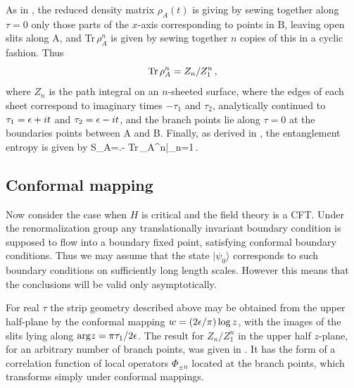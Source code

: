 As in \cite{cc-04}, the reduced density matrix $\rho_A(t)$ is giving
by sewing together along $\tau=0$ only those parts of the $x$-axis
corresponding to points in B, leaving open slits along A, and
Tr$\,\rho_A^n$ is given by sewing together $n$ copies of this in a
cyclic fashion. Thus
\begin{equation}
{\rm Tr}\,\rho_A^n=Z_n/Z_1^n\,,
\end{equation}
where $Z_n$ is the path integral on an $n$-sheeted surface, where
the edges of each sheet correspond to imaginary times $-\tau_1$
and $\tau_2$, analytically continued to $\tau_1=\epsilon+it$ and
$\tau_2=\epsilon-it$, and the branch points lie along $\tau=0$ at
the boundaries points between A and B.
Finally, as derived in \cite{cc-04}, the entanglement entropy is given by
\be
S_A=\left.- {\rm Tr}\,\rho_A^n\right|_{n=1}\,.
\ee


\subsection{Conformal mapping}

Now consider the case when $H$ is critical and the field theory is
a CFT. Under the renormalization group any translationally
invariant boundary condition is supposed to flow into a boundary
fixed point, satisfying conformal boundary conditions. Thus we may
assume that the state $|\psi_0\rangle$ corresponds to such
boundary conditions on sufficiently long length scales. However
this means that the conclusions will be valid only asymptotically.

For real $\tau$ the strip geometry described above may be obtained
from the upper half-plane by the conformal mapping
$w=(2\epsilon/\pi)\log z$, with the images of the slits lying along
${\rm arg} z=\pi\tau_1/2\epsilon$. The result for $Z_n/Z_1^n$ in the
upper half $z$-plane, for an arbitrary number of branch points,
was given in \cite{cc-04}. It has the form of a correlation
function of local operators $\Phi_{\pm n}$ located at the branch
points, which transforms simply under conformal mappings.

